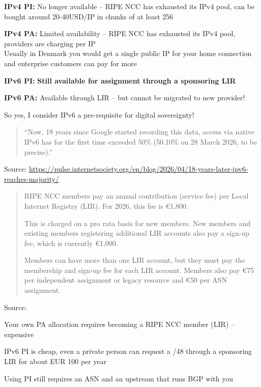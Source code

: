 \documentclass[Screen16to9,17pt]{foils}
\begin{document}
\begin{list2}
  \item {\bf IPv4 PI:} No longer available -- RIPE NCC has exhausted its IPv4 pool, can be bought around 20-40USD/IP in chunks of at least 256
  \item {\bf IPv4 PA:} Limited availability -- RIPE NCC has exhausted its IPv4 pool, providers are charging per IP\\
  Usually in Denmark you would get a single public IP for your home connection and enterprise customers can pay for more
  \item {\bf IPv6 PI:} {\bf Still available for assignment through a sponsoring LIR}
  \item {\bf IPv6 PA:} Available through LIR -- but cannot be migrated to new provider!
\end{list2}

So yes, I consider IPv6 a pre-requisite for digital sovereignty!


\begin{quote}
``Now, 18 years since Google started recording this data, access via
native IPv6 has for the first time exceeded 50\% (50.10\% on 28 March
2026, to be precise).''
\end{quote}
Source: \url{https://pulse.internetsociety.org/en/blog/2026/04/18-years-later-ipv6-reaches-majority/}



\begin{quote}
RIPE NCC members pay an annual contribution (service fee) per Local Internet Registry (LIR). For 2026, this fee is €1,800.

This is charged on a pro rata basis for new members. New members and existing members registering additional LIR accounts also pay a sign-up fee, which is currently €1,000.

Members can have more than one LIR account, but they must pay the membership and sign-up fee for each LIR account. Members also pay €75 per independent assignment or legacy resource and €50 per ASN assignment.
\end{quote}
Source: 



\begin{list2}
\item Your own PA allocation requires becoming a RIPE NCC member (LIR) -- expensive
\item IPv6 PI is cheap, even a private person can request a /48 through a sponsoring LIR for about EUR 100 per year
\item Using PI still requires an ASN and an upstream that runs BGP with you
\end{list2}
\end{document}
